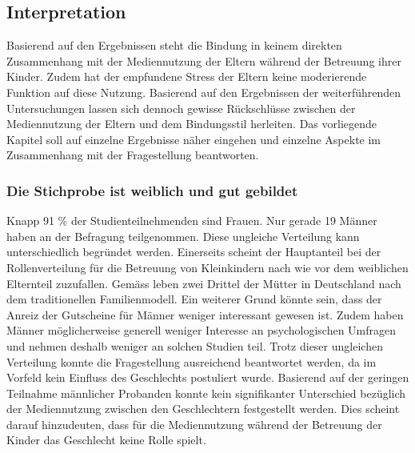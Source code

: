 \subsection{Interpretation} \label{sec:Interpretation}
Basierend auf den Ergebnissen steht die Bindung in keinem direkten Zusammenhang mit der Mediennutzung der Eltern während der Betreuung ihrer Kinder. Zudem hat der empfundene Stress der Eltern keine moderierende Funktion auf diese Nutzung. Basierend auf den Ergebnissen der weiterführenden Untersuchungen lassen sich dennoch gewisse Rückschlüsse zwischen der Mediennutzung der Eltern und dem Bindungsstil herleiten. Das vorliegende Kapitel soll auf einzelne Ergebnisse näher eingehen und einzelne Aspekte im Zusammenhang mit der Fragestellung beantworten.

\subsubsection{Die Stichprobe ist weiblich und gut gebildet}
Knapp 91 \% der Studienteilnehmenden sind Frauen. Nur gerade 19 Männer haben an der Befragung teilgenommen. Diese ungleiche Verteilung kann unterschiedlich begründet werden. Einerseits scheint der Hauptanteil bei der Rollenverteilung für die Betreuung von Kleinkindern nach wie vor dem weiblichen Elternteil zuzufallen. Gemäss  leben zwei Drittel der Mütter in Deutschland nach dem traditionellen Familienmodell. Ein weiterer Grund könnte sein, dass der Anreiz der Gutscheine für Männer weniger interessant gewesen ist. Zudem haben Männer möglicherweise generell weniger Interesse an psychologischen Umfragen und nehmen deshalb weniger an solchen Studien teil. Trotz dieser ungleichen Verteilung konnte die Fragestellung ausreichend beantwortet werden, da im Vorfeld kein Einfluss des Geschlechts postuliert wurde. Basierend auf der geringen Teilnahme männlicher Probanden konnte kein signifikanter Unterschied bezüglich der Mediennutzung zwischen den Geschlechtern festgestellt werden. Dies scheint darauf hinzudeuten, dass für die Mediennutzung während der Betreuung der Kinder das Geschlecht keine Rolle spielt.

